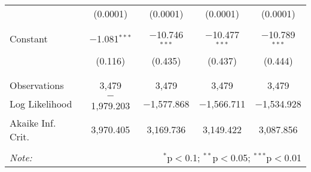 \begin{table}[!htbp]
\begin{tabular}{@{\extracolsep{-5pt}}lcccc}
  & (0.0001) & (0.0001) & (0.0001) & (0.0001) \\ 
  & & & & \\ 
 Constant & $-$1.081$^{***}$ & $-$10.746$^{***}$ & $-$10.477$^{***}$ & $-$10.789$^{***}$ \\ 
  & (0.116) & (0.435) & (0.437) & (0.444) \\ 
  & & & & \\ 
\hline \\[-1.8ex] 
Observations & 3,479 & 3,479 & 3,479 & 3,479 \\ 
Log Likelihood & $-$1,979.203 & $-$1,577.868 & $-$1,566.711 & $-$1,534.928 \\ 
Akaike Inf. Crit. & 3,970.405 & 3,169.736 & 3,149.422 & 3,087.856 \\ 
\hline 
\hline \\[-1.8ex] 
\textit{Note:}  & \multicolumn{4}{r}{$^{*}$p$<$0.1; $^{**}$p$<$0.05; $^{***}$p$<$0.01} \\ 
\end{tabular} 
\end{table} 
